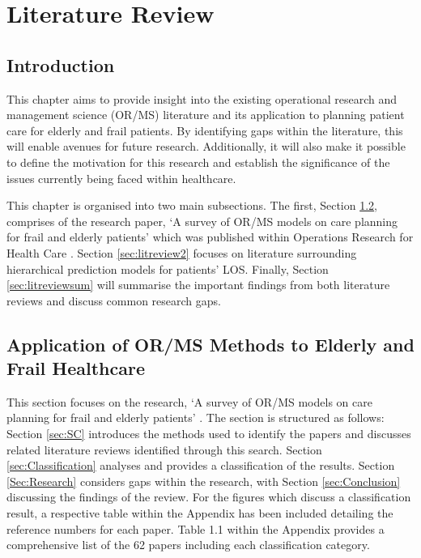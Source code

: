 \documentclass[../thesis.tex]{subfiles}
\begin{document}
\chapter{Literature Review}\label{chp:LiteratureReview}

\section{Introduction}
This chapter aims to provide insight into the existing operational research and management science (OR/MS) literature and its application to planning patient care for elderly and frail patients. By identifying gaps within the literature, this will enable avenues for future research. Additionally, it will also make it possible to define the motivation for this research and establish the significance of the issues currently being faced within healthcare. 

This chapter is organised into two main subsections. The first, Section \ref{sec:litreview1}, comprises of the research paper, `A survey of OR/MS models on care planning for frail and elderly patients' which was published within Operations Research for Health Care \cite{Williams2021}. Section \ref{sec:litreview2} focuses on literature surrounding hierarchical prediction models for patients' LOS. Finally, Section \ref{sec:litreviewsum} will summarise the important findings from both literature reviews and discuss common research gaps.


\section{Application of OR/MS Methods to Elderly and Frail Healthcare}\label{sec:litreview1}

This section focuses on the research, `A survey of OR/MS models on care planning for frail and elderly patients' \cite{Williams2021}. The section is structured as follows: Section \ref{sec:SC} introduces the methods used to identify the papers and discusses related literature reviews identified through this search. Section \ref{sec:Classification} analyses and provides a classification of the results. Section \ref{Sec:Research} considers gaps within the research, with Section \ref{sec:Conclusion} discussing the findings of the review. For the figures which discuss a classification result, a respective table within the Appendix has been included detailing the reference numbers for each paper. Table 1.1 within the Appendix provides a comprehensive list of the 62 papers including each classification category.
 
\end{document}
